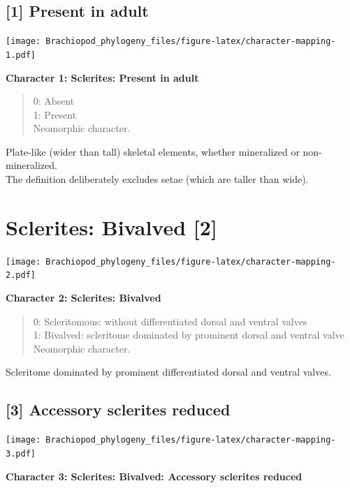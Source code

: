 \documentclass[openany]{book}
\theoremstyle{definition}
\theoremstyle{definition}
\theoremstyle{definition}
\theoremstyle{remark}
\begin{document}
\subsection*{{[}1{]} Present in adult}\label{present-in-adult}

\texttt{[image: Brachiopod\_phylogeny\_files/figure-latex/character-mapping-1.pdf]}

\textbf{Character 1: Sclerites: Present in adult}

\begin{quote}
0: Absent\\
1: Present\\
Neomorphic character.
\end{quote}

Plate-like (wider than tall) skeletal elements, whether mineralized or
non-mineralized.\\
The definition deliberately excludes setae (which are taller than wide).

\section{Sclerites: Bivalved {[}2{]}}\label{sclerites-bivalved-2}

\texttt{[image: Brachiopod\_phylogeny\_files/figure-latex/character-mapping-2.pdf]}

\textbf{Character 2: Sclerites: Bivalved}

\begin{quote}
0: Scleritomous: without differentiated dorsal and ventral valves\\
1: Bivalved: scleritome dominated by prominent dorsal and ventral
valve\\
Neomorphic character.
\end{quote}

Scleritome dominated by prominent differentiated dorsal and ventral
valves.

\subsection*{{[}3{]} Accessory sclerites
reduced}\label{accessory-sclerites-reduced}

\texttt{[image: Brachiopod\_phylogeny\_files/figure-latex/character-mapping-3.pdf]}

\textbf{Character 3: Sclerites: Bivalved: Accessory sclerites reduced}
\end{document}
